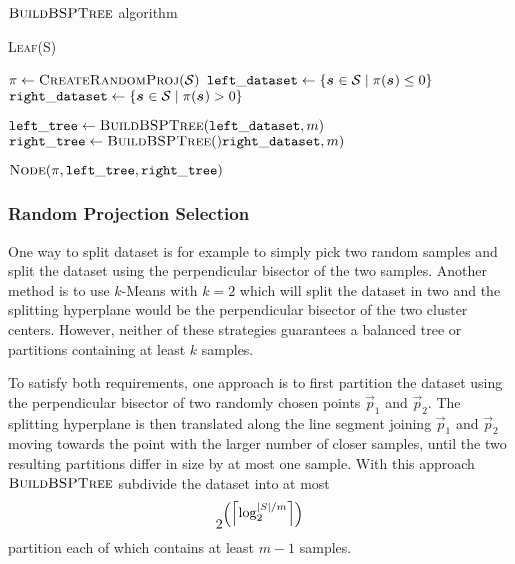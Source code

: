 \begin{algorithm}[H]
	\caption[$\algtitle{BuildBSPTree}$ algorithm]{$\algtitle{BuildBSPTree}$ algorithm}
	\label{alg:build-bsptree}
	\begin{algorithmic}[1]

      \State \Return \textsc{Leaf}(S)
    \EndIf

    \State $\pi \gets \textsc{CreateRandomProj}(\set)$
    \State $\var{left\_dataset} \gets \{\sample[] \in \set \mid \pi(\sample[]) \le 0\}$
    \State $\var{right\_dataset} \gets \{\sample[] \in \set \mid \pi(\sample[]) > 0\}$

    \State $\var{left\_tree} \gets \algtitle{BuildBSPTree}({\var{left\_dataset}, m})$
    \State $\var{right\_tree} \gets \algtitle{BuildBSPTree}(){\var{right\_dataset}, m})$

    \State \Return $\textsc{Node}(\pi, \var{left\_tree}, \var{right\_tree})$
	\end{algorithmic}
\end{algorithm}

\subsubsection{Random Projection Selection}
\label{subsusb:random-projection-selesction}

One way to split dataset is for example to simply pick two random samples and split the dataset using the perpendicular bisector of the two samples. Another method is to use $k$-Means with $k=2$ which will split the dataset in two and the splitting hyperplane would be the perpendicular bisector of the two cluster centers. However, neither of these strategies guarantees a balanced tree or partitions containing at least $k$ samples.

To satisfy both requirements, one approach is to first partition the dataset using the perpendicular bisector of two randomly chosen points $\vec{p}_1$ and $\vec{p}_2$. The splitting hyperplane is then translated along the line segment joining $\vec{p}_1$ and $\vec{p}_2$  moving towards the point with the larger number of closer samples, until the two resulting partitions differ in size by at most one sample. With this approach $\algtitle{BuildBSPTree}$ subdivide the dataset into at most
\[
  2^{\left({\textstyle \ceil*{\log_2^{|S|/m}}}\right)}
\]
partition each of which contains at least $m-1$ samples.

